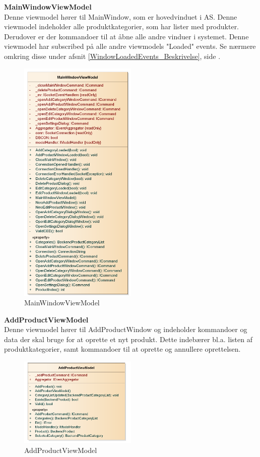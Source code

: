 \textbf{MainWindowViewModel}\\
Denne viewmodel hører til MainWindow, som er hovedvinduet i \gls{AS}. Denne viewmodel indeholder alle produktkategorier, som har lister med produkter. Derudover er der kommandoer til at åbne alle andre vinduer i systemet. Denne viewmodel har subscribed på alle andre viewmodels "Loaded" events. Se nærmere omkring disse under afsnit \ref{WindowLoadedEvents_Beskrivelse}, side \pageref{WindowLoadedEvents_Beskrivelse}.
\begin{figure}[H]
	\centering
	\includegraphics[width=0.5\textwidth]{Systemdesign/backend/klassebeskrivelser/Images/MainWindowVM}
	\caption{MainWindowViewModel}
	\label{fig:MainWindowViewModel}
\end{figure}
\bigskip

\textbf{AddProductViewModel}\\
Denne viewmodel hører til AddProductWindow og indeholder kommandoer og data der skal bruge for at oprette et nyt produkt. Dette indebærer bl.a. listen af produktkategorier, samt kommandoer til at oprette og annullere oprettelsen.
\begin{figure}[H]
	\centering
	\includegraphics[width=0.5\textwidth]{Systemdesign/backend/klassebeskrivelser/Images/AddProductVM}
	\caption{AddProductViewModel}
	\label{fig:AddProductViewModel}
\end{figure}
\bigskip

